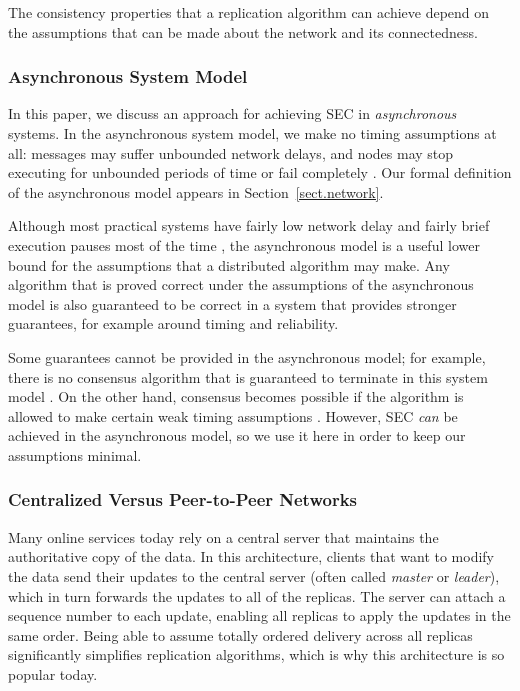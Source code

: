 The consistency properties that a replication algorithm can achieve depend on the assumptions that
can be made about the network and its connectedness.

\subsubsection{Asynchronous System Model}

In this paper, we discuss an approach for achieving SEC in \emph{asynchronous} systems. In the
asynchronous system model, we make no timing assumptions at all: messages may suffer unbounded
network delays, and nodes may stop executing for unbounded periods of time or fail completely
\cite{Cachin:2011wt}. Our formal definition of the asynchronous model appears in
Section~\ref{sect.network}.

Although most practical systems have fairly low network delay and fairly brief execution pauses most
of the time \cite{Bailis:2014jx}, the asynchronous model is a useful lower bound for the assumptions
that a distributed algorithm may make. Any algorithm that is proved correct under the assumptions of
the asynchronous model is also guaranteed to be correct in a system that provides stronger
guarantees, for example around timing and reliability.

Some guarantees cannot be provided in the asynchronous model; for example, there is no consensus
algorithm that is guaranteed to terminate in this system model \cite{Fischer:1985tt}. On the other
hand, consensus becomes possible if the algorithm is allowed to make certain weak timing assumptions
\cite{Chandra:1996cp}. However, SEC \emph{can} be achieved in the asynchronous model, so we use it
here in order to keep our assumptions minimal.

\subsubsection{Centralized Versus Peer-to-Peer Networks}\label{sect.central.vs.p2p}

Many online services today rely on a central server that maintains the authoritative copy of the
data. In this architecture, clients that want to modify the data send their updates to the central
server (often called \emph{master} or \emph{leader}), which in turn forwards the updates to all of
the replicas. The server can attach a sequence number to each update, enabling all replicas to apply
the updates in the same order. Being able to assume totally ordered delivery across all replicas
significantly simplifies replication algorithms, which is why this architecture is so popular today.

